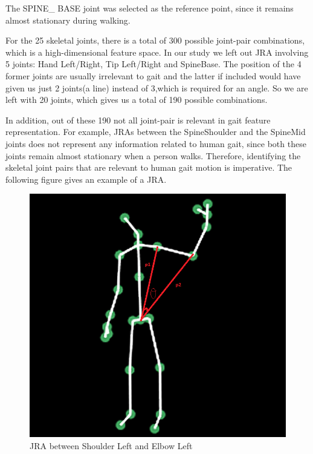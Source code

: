 \noindent The SPINE\_ BASE joint was selected as the reference point, since it remains almost stationary during walking.                                   

\noindent For the 25 skeletal joints, there is a total of 300 possible joint-pair combinations, which is a high-dimensional feature space. In our study we left out JRA involving 5 joints:  Hand Left/Right, Tip Left/Right and SpineBase. The position of the 4 former joints are usually irrelevant to gait and the latter if included would have given us just 2 joints(a line) instead of 3,which is required for an angle. So we are left with 20 joints, which gives us a total of 190 possible combinations.

\noindent In addition, out of these 190 not all joint-pair is relevant in gait feature representation. For example, JRAs between the SpineShoulder and the SpineMid joints does not represent any information related to human gait, since both these joints remain almost stationary when a person walks. Therefore, identifying the skeletal joint pairs that are relevant to human gait motion is imperative. The following figure gives an example of a JRA. \\
\begin{figure}[h]
\centering
\includegraphics[scale=0.7]{angle.png}
\caption{JRA between Shoulder Left and Elbow Left}
\end{figure}

